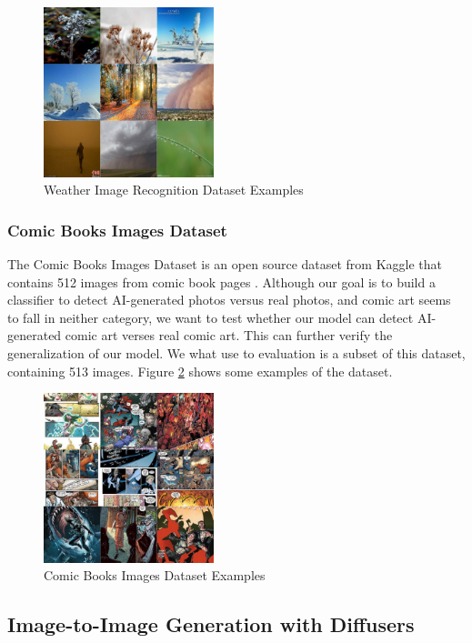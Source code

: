 \documentclass[11pt]{article}
\begin{document}
\begin{figure}[ht]
  \centering
  \includegraphics[width=140pt]{./assets/paper_weather_dataset.jpg}
  \caption{Weather Image Recognition Dataset Examples}
  \label{fig:paper_weather_dataset}
\end{figure}

\subsubsection{Comic Books Images Dataset}
\label{sec:comic_dataset}

The Comic Books Images Dataset is an open source dataset from Kaggle that contains 512 images from comic book pages \cite{cenkbircanoglu2017comicbooksimages}. Although our goal is to build a classifier to detect AI-generated photos versus real photos, and comic art seems to fall in neither category, we want to test whether our model can detect AI-generated comic art verses real comic art. This can further verify the generalization of our model. We what use to evaluation is a subset of this dataset, containing 513 images. Figure \ref{fig:paper_comic_dataset} shows some examples of the dataset.

\begin{figure}[ht]
  \centering
  \includegraphics[width=140pt]{./assets/paper_comic_dataset.jpg}
  \caption{Comic Books Images Dataset Examples}
  \label{fig:paper_comic_dataset}
\end{figure}

\subsection{Image-to-Image Generation with Diffusers}
\end{document}
